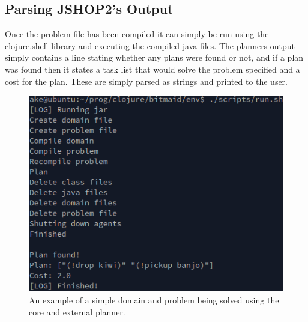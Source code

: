\subsection{Parsing JSHOP2's Output}
Once the problem file has been compiled it can simply be run using the
clojure.shell library and executing the compiled java files. The planners output
simply contains a line stating whether any plans were found or not, and if a
plan was found then it states a task list that would solve the problem specified
and a cost for the plan. These are simply parsed as strings and printed to the
user.

\begin{figure}
  \centering
  \includegraphics[width=0.6\linewidth]{figures/core-output.png}
  \caption{An example of a simple domain and problem being solved using the core
    and external planner.}
  \label{fig:core-example-output}
\end{figure}

